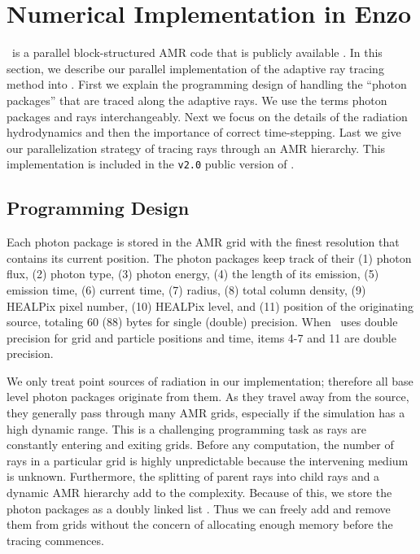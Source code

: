 \documentclass[apj,onecolumn]{emulateapj}
\begin{document}
\section{Numerical Implementation in Enzo}

\enzo~is a parallel block-structured AMR \citep{BergerAMR} code that
is publicly available \citep{BryanNorman1997, OShea2004}.  In this
section, we describe our parallel implementation of the adaptive ray
tracing method into \enzo.  First we explain the programming design of
handling the ``photon packages'' that are traced along the adaptive
rays.  We use the terms photon packages and rays interchangeably.  Next
we focus on the details of the radiation hydrodynamics and then the
importance of correct time-stepping.  Last we give our parallelization
strategy of tracing rays through an AMR hierarchy.  This
implementation is included in the \texttt{v2.0} public version of
\enzo.

\subsection{Programming Design}
\label{sec:design}

Each photon package is stored in the AMR grid with the finest
resolution that contains its current position.  The photon packages
keep track of their (1) photon flux, (2) photon type, (3) photon
energy, (4) the length of its emission, (5) emission time, (6) current
time, (7) radius, (8) total column density, (9) HEALPix pixel number,
(10) HEALPix level, and (11) position of the originating source,
totaling 60 (88) bytes for single (double) precision.  When \enzo~uses
double precision for grid and particle positions and time, items 4-7
and 11 are double precision.

We only treat point sources of radiation in our implementation;
therefore all base level photon packages originate from them.  As they
travel away from the source, they generally pass through many AMR
grids, especially if the simulation has a high dynamic range.  This is
a challenging programming task as rays are constantly entering and
exiting grids.  Before any computation, the number of rays in a
particular grid is highly unpredictable because the intervening medium
is unknown.  Furthermore, the splitting of parent rays into child rays
and a dynamic AMR hierarchy add to the complexity.  Because of this,
we store the photon packages as a doubly linked list
\citep{Abel02_RT}.  Thus we can freely add and remove them from grids
without the concern of allocating enough memory before the tracing
commences.
\end{document}
